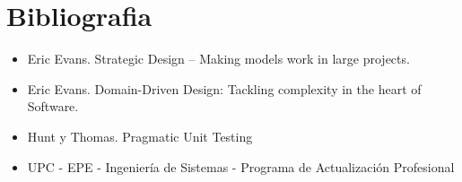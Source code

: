 \documentclass{article}
\begin{document}
\section{Bibliografia}
\begin{itemize}
\item Eric Evans. Strategic Design – Making models work in large projects. 

\item Eric Evans. Domain-Driven Design: Tackling complexity in the heart of Software. 

\item Hunt y Thomas. Pragmatic Unit Testing 

\item UPC - EPE - Ingeniería de Sistemas - Programa de Actualización Profesional 
\end{itemize} 
\end{document}

